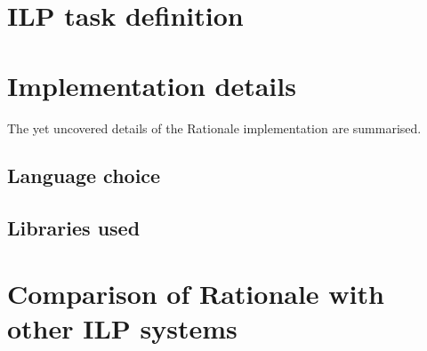 \section{ILP task definition}

\section{Implementation details}
The yet uncovered details of the Rationale implementation are summarised.

\subsection{Language choice}

\subsection{Libraries used}

\section{Comparison of Rationale with other ILP systems}